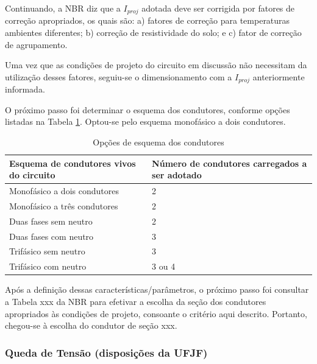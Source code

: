 Continuando, a NBR diz que a $I_{proj}$ adotada deve ser corrigida por fatores de correção apropriados, os quais são: a) fatores de correção para temperaturas ambientes diferentes; b) correção de resistividade do solo; e c) fator de correção de agrupamento.

Uma vez que as condições de projeto do circuito em discussão não necessitam da utilização desses fatores, seguiu-se o dimensionamento com a $I_{proj}$ anteriormente informada.

	O próximo passo foi determinar o esquema dos condutores, conforme opções listadas na Tabela \ref{metodo-definicao}. Optou-se pelo esquema monofásico a dois condutores.
	
\begin{table}[h]
\centering
\begin{tabular}{| l | p{7cm} |}
\hline
Esquema de condutores vivos do circuito & Número de condutores carregados a ser adotado \\ \hline
Monofásico a dois condutores            & 2                                             \\ \hline
Monofásico a três condutores            & 2                                             \\ \hline
Duas fases sem neutro                   & 2                                             \\ \hline
Duas fases com neutro                   & 3                                             \\ \hline
Trifásico sem neutro                    & 3                                             \\ \hline
Trifásico com neutro                    & 3 ou 4
\\ \hline
\end{tabular}
\caption{Opções de esquema dos condutores}
\label{metodo-definicao}
\end{table}

Após a definição dessas características/parâmetros, o próximo passo foi consultar a Tabela xxx da NBR para efetivar a escolha da seção dos condutores apropriados às condições de projeto, consoante o critério aqui descrito. Portanto, chegou-se à escolha do condutor de seção xxx.

\subsubsection{Queda de Tensão (disposições da UFJF)}


